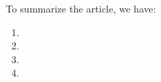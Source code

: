 
To summarize the article, we have:
\begin{enumerate}[\bfseries (1)]
	\setlength{\parsep}{0ex} %
	\setlength{\topsep}{2ex} %
	\setlength{\itemsep}{1ex} %
	\item 
	\item 
	\item 
	\item 
\end{enumerate}
